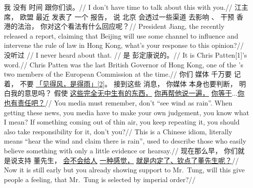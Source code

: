 \endgl
\xe
\ex[glhangstyle=none, everygla=\rm, exnoformat=X:, exno={\smallcaps{ji}}, belowexskip=0pt, aboveexskip=-.5cm]
\begingl
\gla
{我} {没有} {时间} {} {跟你们谈。}//
\glb
{I} {don't have} {time} {to} {talk about this with you.}//
\endgl
\xe
\ex[glhangstyle=none, everygla=\rm, exnoformat=X:, exno={\smallcaps{jo}}, belowexskip=0pt, aboveexskip=-.5cm]
\begingl
\gla
{江主席，} {欧盟} {最近} {发表了} {一个} {报告，} {说} {北京} {会透过一些渠道} {去影响} {、} {干预} {香港的法治，} {你对这个看法有什么回应呢？}//
\glb
{President Jiang,} {the } {recently} {released} {a} {report,} {claiming that} {Beijing} {will use some channel} {to influence} {and} {intervene} {the rule of law in Hong Kong,} {what's your response to this opinion?}//
\endgl
\xe
\ex[glhangstyle=none, everygla=\rm, exnoformat=X:, exno={\smallcaps{ji}}, belowexskip=0pt, aboveexskip=-.5cm]
\begingl
\gla
{没听过} {}//
\glb
{I never heard about that.} {}//
\endgl
\xe
\ex[glhangstyle=none, everygla=\rm, exnoformat=X:, exno={\smallcaps{jo}}, belowexskip=0pt, aboveexskip=-.5cm]
\begingl
\gla
{是} {彭定康说的。}//
\glb
{It is} {Chris Patten[1]'s word.}//
\glft[] [1] Chris Patten was the last British Governor of Hong Kong, one of the 's two members of the European Commission at the time.//
\endgl
\xe
\ex[glhangstyle=none, everygla=\rm, exnoformat=X:, exno={\smallcaps{ji}}, belowexskip=0pt, aboveexskip=-.5cm]
\begingl
\gla
{你们} {媒体} {千万要} {记着，} {不要} {\underline{「见得风，是得雨」[2]}。} {接到这些} {消息，} {你媒体} {本身也要判断，} {明白我的意思吗？} {假使} {\underline{这些完全无中生有的东西，}} {\underline{你再帮他说一遍，}} {\underline{你等于$\ldots$你也有责任吧？}}//
\glb
{You} {media} {must} {remember,} {don't} {``see wind as rain''.} {When getting these} {news,} {you media} {have to make your own judgement,} {you know what I mean?} {If} {something coming out of thin air,} {you keep repeating it,} {you should also take responsibility for it, don't you?}//
\glft[] [2] This is a Chinese idiom, literally means ``hear the wind and claim there is rain'', used to describe those who easily believe something with only a little evidence or hearsay.//
\endgl
\xe
\ex[glhangstyle=none, everygla=\rm, exnoformat=X:, exno={\smallcaps{jo}}, belowexskip=0pt, aboveexskip=-.5cm]
\begingl
\gla
{现在那么早，} {你们就是说支持} {董先生，} {\underline{会不会给人}} {\underline{一种感觉，}} {\underline{就是内定了、钦点了董先生呢？}}//
\glb
{Now it is still early} {but you already showing support to} {Mr.\ Tung,} {will this give people} {a feeling,} {that Mr.\ Tung is selected by imperial order?}//
